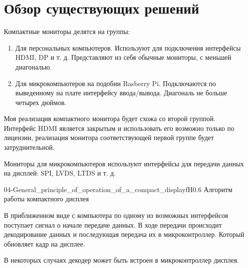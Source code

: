 \chapter{Обзор существующих решений}

	Компактные мониторы делятся на группы:
	
	\begin{enumerate}
		\item Для персональных компьютеров. Используют для подключения интерфейсы HDMI, DP и т. д. Представляют из себя обычные мониторы, с меньшей диагональю.
		\item Для микрокомпьютеров на подобии Rasberry Pi. Подключаются по выведенному на плате интерфейсу ввода/вывода. Диагональ не больше четырех дюймов.
	\end{enumerate}
	
	 Моя реализация компактного монитора будет схожа со второй группой. Интерфейс HDMI является закрытым и использовать его возможно только по лицензии, реализация монитора соответствующей первой группе будет затруднительной.
	 
	 Мониторы для микрокомпьютеров используют интерфейсы для передачи данных на дисплей: SPI, LVDS, LTDS и т. д.
	 
	 {04-General_principle_of_operation_of_a_compact_display}{f}{H}{0.6\textwidth}
	 {Алгоритм работы компактного дисплея} %
	 
	 В приближенном виде с компьютера по одному из возможных интерфейсов поступает сигнал о начале передаче данных. В ходе передачи происходит декодирование данных и последующая передача их в микроконтроллер. Который обновляет кадр на дисплее.
	 
	 В некоторых случаях декодер может быть встроен в микроконтроллер дисплея.